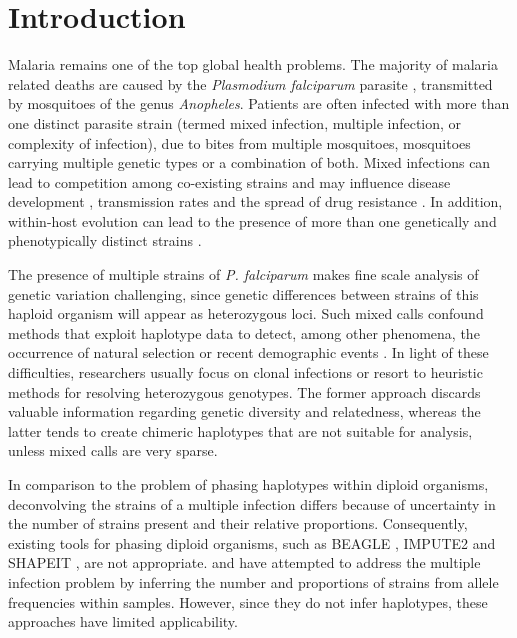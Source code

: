 \documentclass{bioinfo}
\begin{document}
\maketitle

\section{Introduction}
Malaria remains one of the top global health problems. The majority of malaria related deaths are caused by the {\it Plasmodium falciparum} parasite \citep{WHO2016}, transmitted by mosquitoes of the genus {\it Anopheles}. Patients are often infected with more than one distinct parasite strain (termed mixed infection, multiple infection, or complexity of infection), due to bites from multiple mosquitoes, mosquitoes carrying multiple genetic types or a combination of both. Mixed infections  can lead to competition among co-existing strains and may influence disease development \citep{deRoode2005}, transmission rates \citep{Arnot1998} and the spread of drug resistance \citep{deRoode2004}. In addition, within-host evolution can lead to the presence of more than one genetically and phenotypically distinct strains \citep{Bell2006}.

The presence of multiple strains of {\it P. falciparum} makes fine scale analysis of genetic variation challenging, since genetic differences between strains of this haploid organism will appear as heterozygous loci. Such mixed calls confound methods that exploit haplotype data to detect, among other phenomena, the occurrence of natural selection or recent demographic events \citep{Harris2013, Lawson2012, Mathieson2014, Sabeti2002}. In light of these difficulties, researchers usually focus on clonal infections or resort to heuristic methods for resolving heterozygous genotypes. The former approach discards valuable information regarding genetic diversity and relatedness, whereas the latter tends to create chimeric haplotypes that are not suitable for analysis, unless mixed calls are very sparse.

In comparison to the problem of phasing haplotypes within diploid organisms, deconvolving the strains of a multiple infection differs because of uncertainty in the number of strains present and their relative proportions.  Consequently, existing tools for phasing diploid organisms, such as BEAGLE \citep{Browning2007}, IMPUTE2 \citep{Howie2009} and SHAPEIT \citep{Delaneau2012, Oconnell2014}, are not appropriate. \citet{Galinsky2015} and \citet{Jack2016} have attempted to address the multiple infection problem by inferring the number and proportions of strains from allele frequencies within samples.  However, since they do not infer haplotypes, these approaches have limited applicability.
\end{document}
